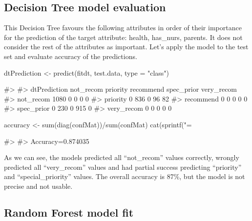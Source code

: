 \hypertarget{decision-tree-model-evaluation}{%
\subsection{Decision Tree model
evaluation}\label{decision-tree-model-evaluation}}

This Decision Tree favours the following attributes in order of their
importance for the prediction of the target attribute: health,
has\_nurs, parents. It does not consider the rest of the attributes as
important. Let's apply the model to the test set and evaluate accuracy
of the predictions.

\begin{Schunk}
\begin{Sinput}
dtPrediction <- predict(fitdt, test.data, type = "class")
\end{Sinput}
\end{Schunk}

\begin{Schunk}
\begin{Soutput}
#>             
#> dtPrediction not_recom priority recommend spec_prior very_recom
#>   not_recom       1080        0         0          0          0
#>   priority           0      836         0         96         82
#>   recommend          0        0         0          0          0
#>   spec_prior         0      230         0        915          0
#>   very_recom         0        0         0          0          0
\end{Soutput}
\begin{Sinput}
accuracy <- sum(diag(confMat))/sum(confMat)
cat(sprintf("\nAccuracy=%f", accuracy))
\end{Sinput}
\begin{Soutput}
#> 
#> Accuracy=0.874035
\end{Soutput}
\end{Schunk}

As we can see, the models predicted all ``not\_recom'' values correctly,
wrongly predicted all ``very\_recom'' values and had partial success
predicting ``priority'' and ``special\_priority'' values. The overall
accuracy is 87\%, but the model is not precise and not usable.

\hypertarget{random-forest-model-fit}{%
\subsection{Random Forest model fit}\label{random-forest-model-fit}}

